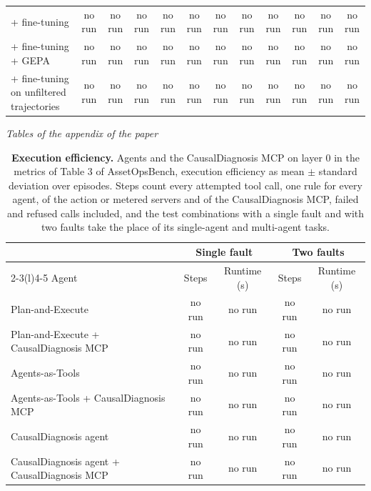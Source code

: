 \documentclass[10pt]{article}
\begin{document}
\begin{table}[H]
\begin{tabular}{lccccccccccc}
\quad + fine-tuning & no run & no run & no run & no run & no run & no run & no run & no run & no run & no run & no run \\
\quad + fine-tuning + GEPA & no run & no run & no run & no run & no run & no run & no run & no run & no run & no run & no run \\
\quad + fine-tuning on unfiltered trajectories & no run & no run & no run & no run & no run & no run & no run & no run & no run & no run & no run \\
\bottomrule
\end{tabular}
\end{table}
\vspace{-8pt}
\begin{center}\footnotesize\textit{Tables of the appendix of the paper}\end{center}
\vspace{-10pt}
\begin{table}[H]\centering\footnotesize
\caption{\textbf{Execution efficiency.} Agents and the CausalDiagnosis MCP on layer 0 in the metrics of Table 3 of AssetOpsBench, execution efficiency as mean $\pm$ standard deviation over episodes. Steps count every attempted tool call, one rule for every agent, of the action or metered servers and of the CausalDiagnosis MCP, failed and refused calls included, and the test combinations with a single fault and with two faults take the place of its single-agent and multi-agent tasks.}
\label{tab:efficiency}
\setlength{\tabcolsep}{3pt}
\begin{tabular}{lcccc}
\toprule
 & \multicolumn{2}{c}{Single fault} & \multicolumn{2}{c}{Two faults} \\
\cmidrule(lr){2-3}\cmidrule(l){4-5}
Agent & Steps & Runtime (s) & Steps & Runtime (s) \\
\midrule
Plan-and-Execute & no run & no run & no run & no run \\
Plan-and-Execute + CausalDiagnosis MCP & no run & no run & no run & no run \\
Agents-as-Tools & no run & no run & no run & no run \\
Agents-as-Tools + CausalDiagnosis MCP & no run & no run & no run & no run \\
CausalDiagnosis agent & no run & no run & no run & no run \\
CausalDiagnosis agent + CausalDiagnosis MCP & no run & no run & no run & no run \\
\bottomrule
\end{tabular}
\end{table}
\end{document}

